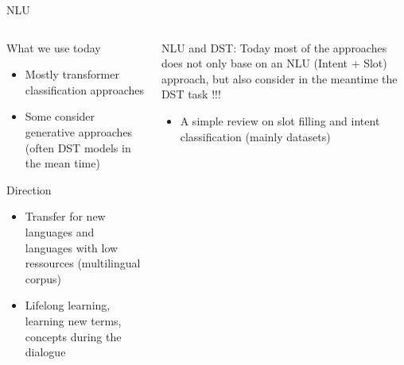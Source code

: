 \documentclass[10pt,aspectratio=169]{beamer}
\begin{document}
\begin{frame}{NLU}
       \begin{columns}
        \begin{column}{0.6\textwidth}
            \begin{block}{What we use today}
                \begin{itemize}
                    \item Mostly transformer classification approaches
                    \item Some consider generative approaches (often DST models in the mean time)
                \end{itemize}
            \end{block}
            \begin{block}{Direction}
                \begin{itemize}
                    \item Transfer for new languages and languages with low ressources \cite{cattan-etal-2021-cross} (multilingual corpus)
                    \item Lifelong learning, learning new terms, concepts during the dialogue \cite{verron-2021-evaluate}
                \end{itemize}
            \end{block}
        \end{column}
        \begin{column}{0.4\textwidth}
            \begin{alertblock}{NLU and DST:}
                Today most of the approaches does not only base on an NLU (Intent + Slot) approach, but also consider in the meantime the DST task !!!
                \begin{itemize}
                    \item A simple review on slot filling and intent classification (mainly datasets) \cite{larson-2022-survey}
                \end{itemize}
            \end{alertblock}

        \end{column}
    \end{columns}
\end{frame}
\end{document}
